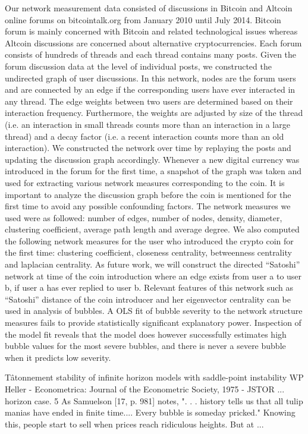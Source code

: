 Our network measurement data consisted of discussions in Bitcoin and Altcoin online forums on bitcointalk.org from January 2010 until July 2014. 
Bitcoin forum is mainly concerned with Bitcoin and related technological issues whereas Altcoin discussions are concerned about alternative cryptocurrencies. Each forum consists of hundreds of threads and each thread contains many posts.  Given the forum discussion data at the level of individual posts, we constructed the undirected graph of user discussions. In this network, nodes are the forum users and are connected by an edge if the corresponding users have ever interacted in any thread. The edge weights between two users are determined based on their interaction frequency. Furthermore, the weights are adjusted by size of the thread (i.e. an interaction in small threads counts more than an interaction in a large thread) and a decay factor (i.e. a recent interaction counts more than an old interaction). We constructed the network over time by replaying the posts and updating the discussion graph accordingly.  Whenever a new digital currency was introduced in the forum for the first time, a snapshot of the graph was taken and used for extracting various network measures corresponding to the coin. It is important to analyze the discussion graph before the coin is mentioned for the first time to avoid any possible confounding factors. The network measures we used were as followed: number of edges, number of nodes, density, diameter, clustering coefficient, average path length and average degree. We also computed the following network measures for the user who introduced the crypto coin for the first time: clustering coefficient, closeness centrality, betweenness centrality and laplacian centrality. As future work, we will construct the directed “Satoshi” network at time of the coin introduction where an edge exists from user a to user b, if user a has ever replied to user b. Relevant features of this network such as “Satoshi” distance of the coin introducer and her eigenvector centrality can be used in analysis of bubbles.
A OLS fit of bubble severity to the network structure measures fails to provide statistically significant explanatory power. Inspection of the model fit reveals that the model does however successfully estimates high bubble values for the most severe bubbles, and there is never a severe bubble when it predicts low severity.


Tâtonnement stability of infinite horizon models with saddle-point instability
WP Heller - Econometrica: Journal of the Econometric Society, 1975 - JSTOR
... horizon case. 5 As Samuelson [17, p. 981] notes, ". . . history tells us that all tulip
manias have ended in finite time.... Every bubble is someday pricked." Knowing this,
people start to sell when prices reach ridiculous heights. But at ...





